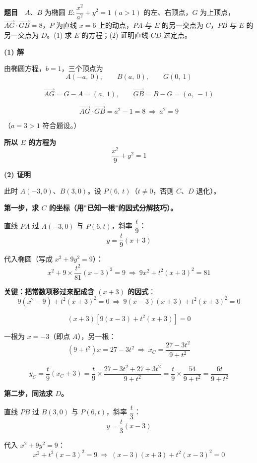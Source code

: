 
\textbf{题目}　$A$、$B$ 为椭圆 $E:\dfrac{x^{2}}{a^{2}}+y^{2}=1\ (a>1)$ 的左、右顶点，$G$ 为上顶点，$\overrightarrow{AG}\cdot\overrightarrow{GB}=8$，$P$ 为直线 $x=6$ 上的动点，$PA$ 与 $E$ 的另一交点为 $C$，$PB$ 与 $E$ 的另一交点为 $D$。(1) 求 $E$ 的方程；(2) 证明直线 $CD$ 过定点。

\par\medskip

\textbf{(1) 解}

由椭圆方程，$b=1$，三个顶点为
\[A(-a,\ 0),\qquad B(a,\ 0),\qquad G(0,\ 1)\]

\[\overrightarrow{AG}=G-A=(a,\ 1),\qquad \overrightarrow{GB}=B-G=(a,\ -1)\]

\[\overrightarrow{AG}\cdot\overrightarrow{GB}=a^{2}-1=8\ \Longrightarrow\ a^{2}=9\]

（$a=3>1$  符合题设。）

\textbf{所以 $E$ 的方程为}
\[\frac{x^{2}}9+y^{2}=1\]

\par\medskip

\textbf{(2) 证明}

此时 $A(-3,0)$、$B(3,0)$。设 $P(6,\ t)$（$t\ne0$，否则 $C$、$D$ 退化）。

\textbf{第一步，求 $C$ 的坐标（用"已知一根"的因式分解技巧）。}

直线 $PA$ 过 $A(-3,0)$ 与 $P(6,t)$，斜率 $\dfrac t9$：
\[y=\frac t9(x+3)\]

代入椭圆（写成 $x^{2}+9y^{2}=9$）：
\[x^{2}+9\times\frac{t^{2}}{81}(x+3)^{2}=9\ \Longrightarrow\ 9x^{2}+t^{2}(x+3)^{2}=81\]

\textbf{关键：把常数项移过来配成含 $(x+3)$ 的因式}：
\[9\left(x^{2}-9\right)+t^{2}(x+3)^{2}=0\ \Longrightarrow\ 9(x-3)(x+3)+t^{2}(x+3)^{2}=0\]

\[(x+3)\left[9(x-3)+t^{2}(x+3)\right]=0\]

一根为 $x=-3$（即点 $A$），另一根：
\[\left(9+t^{2}\right)x=27-3t^{2}\ \Longrightarrow\ x_C=\frac{27-3t^{2}}{9+t^{2}}\]

\[y_C=\frac t9\left(x_C+3\right)=\frac t9\times\frac{27-3t^{2}+27+3t^{2}}{9+t^{2}}=\frac t9\times\frac{54}{9+t^{2}}=\frac{6t}{9+t^{2}}\]

\textbf{第二步，同法求 $D$。}

直线 $PB$ 过 $B(3,0)$ 与 $P(6,t)$，斜率 $\dfrac t3$：
\[y=\frac t3(x-3)\]

代入 $x^{2}+9y^{2}=9$：
\[x^{2}+t^{2}(x-3)^{2}=9\ \Longrightarrow\ (x-3)(x+3)+t^{2}(x-3)^{2}=0\]

